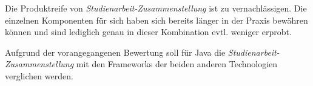 Die Produktreife von \emph{Studienarbeit-Zusammenstellung} ist zu vernachlässigen. Die einzelnen Komponenten für sich haben sich bereits länger in der Praxis bewähren können und sind lediglich genau in dieser Kombination evtl. weniger erprobt.

Aufgrund der vorangegangenen Bewertung soll für Java die \emph{Studienarbeit-Zusammenstellung} mit den Frameworks der beiden anderen Technologien verglichen werden.
